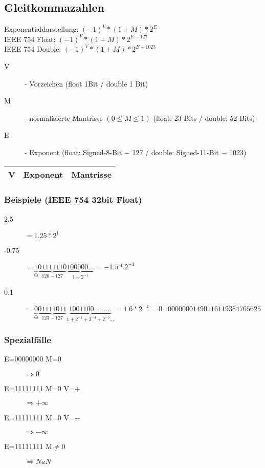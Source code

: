 \documentclass[a4paper,10pt]{article}
\begin{document}
\subsection{Gleitkommazahlen}
Exponentialdarstellung: $(-1)^V * (1+M)*2^E$ \\
IEEE 754 Float: $(-1)^V * (1+M) * 2^{E-127}$ \\
IEEE 754 Double: $(-1)^V * (1+M) * 2^{E-1023}$ \\
\begin{description}
	\item[V] - Vorzeichen (float 1Bit / double 1 Bit)
	\item[M] - normalisierte Mantrisse $(0 \leq M \leq 1)$ (float: 23 Bits / double: 52 Bits)
	\item[E] - Exponent (float: Signed-8-Bit $-$ 127  / double: Signed-11-Bit $-$ 1023)
\end{description} 
\begin{tabular}{|c|l|l|}
	\hline
	V & Exponent & Mantrisse \\
	\hline
\end{tabular}

\subsubsection{Beispiele (IEEE 754 32bit Float)}
\begin{description}
	\item[2.5] $=1.25*2^1$
	\item[-0.75] $=\underbrace{1}_{\ominus}\underbrace{01111110}_{126 - 127} \underbrace{100000...}_{1+2^{-1}}=-1.5*2^{-1}$
	\item[0.1] $=\underbrace{0}_{\oplus}\underbrace{01111011}_{123 - 127} \underbrace{100\overline{1100}.........}_{1+2^{-1}+2^{-4}+2^{-5}...}=1.6*2^{-4} = 0.100000001490116119384765625$ 
\end{description}

\subsubsection{Spezialf\"alle}
\begin{description}
	\item[E=00000000 M=0] $\Rightarrow 0$
	\item[E=11111111 M=0 V=+] $\Rightarrow +\infty$
	\item[E=11111111 M=0 V=$-$] $\Rightarrow -\infty$
	\item[E=11111111 M$\neq$0] $\Rightarrow NaN$
\end{description}
\end{document}
